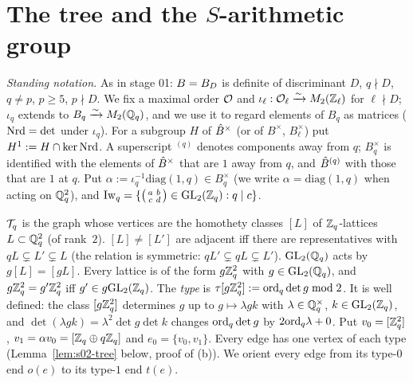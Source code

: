 \section{The tree and the \texorpdfstring{$S$}{S}-arithmetic group}

\emph{Standing notation.} As in stage 01: $B=B_D$ is definite of discriminant $D$, $q\nmid D$, $q\neq p$, $p\ge5$,
$p\nmid D$. We fix a maximal order $\mathcal{O}$ and $\iota_\ell:\mathcal{O}_\ell\xrightarrow{\sim}M_2(\mathbb{Z}_\ell)$ for $\ell\nmid D$; $\iota_q$ extends to
$B_q\xrightarrow{\sim}M_2(\mathbb{Q}_q)$, and we use it to regard elements of $B_q$ as matrices ($\mathrm{Nrd}=\det$ under $\iota_q$). For a subgroup $H$ of
$\hat{B}^\times$ (or of $B^\times$, $B_\ell^\times$) put $H^1:=H\cap\ker\mathrm{Nrd}$. A superscript ${}^{(q)}$ denotes components away from $q$;
$B_q^\times$ is identified with the elements of $\hat{B}^\times$ that are $1$ away from $q$, and $\hat{B}^{(q)}$ with those that are $1$ at $q$.
Put $\alpha:=\iota_q^{-1}\mathrm{diag}(1,q)\in B_q^\times$ (we write $\alpha=\mathrm{diag}(1,q)$ when acting on $\mathbb{Q}_q^2$), and
$\mathrm{Iw}_q=\{\left(\begin{smallmatrix}a&b\\c&d\end{smallmatrix}\right)\in\mathrm{GL}_2(\mathbb{Z}_q):q\mid c\}$.

\begin{definition}\label{def:s02-tree}
$\mathcal{T}_q$ is the graph whose vertices are the homothety classes $[L]$ of $\mathbb{Z}_q$-lattices $L\subset\mathbb{Q}_q^2$ (of rank~$2$).
$[L]\ne[L']$ are adjacent iff there are representatives with $qL\subsetneq L'\subsetneq L$ (the relation is symmetric: $qL'\subsetneq qL\subsetneq L'$).
$\mathrm{GL}_2(\mathbb{Q}_q)$ acts by $g[L]=[gL]$. Every lattice is of the form $g\mathbb{Z}_q^2$ with $g\in\mathrm{GL}_2(\mathbb{Q}_q)$, and $g\mathbb{Z}_q^2=g'\mathbb{Z}_q^2$ iff
$g'\in g\mathrm{GL}_2(\mathbb{Z}_q)$. The \emph{type} is $\tau[g\mathbb{Z}_q^2]:=\mathrm{ord}_q\det g\bmod 2$. It is well defined: the class $[g\mathbb{Z}_q^2]$ determines
$g$ up to $g\mapsto\lambda gk$ with $\lambda\in\mathbb{Q}_q^\times$, $k\in\mathrm{GL}_2(\mathbb{Z}_q)$, and $\det(\lambda gk)=\lambda^2\det g\det k$ changes
$\mathrm{ord}_q\det g$ by $2\mathrm{ord}_q\lambda+0$.
Put $v_0=[\mathbb{Z}_q^2]$, $v_1=\alpha v_0=[\mathbb{Z}_q\oplus q\mathbb{Z}_q]$ and $e_0=\{v_0,v_1\}$. Every edge has one vertex of
each type (Lemma~\ref{lem:s02-tree} below, proof of (b)). We orient every edge from its type-$0$ end $o(e)$ to its type-$1$ end $t(e)$.
\end{definition}

